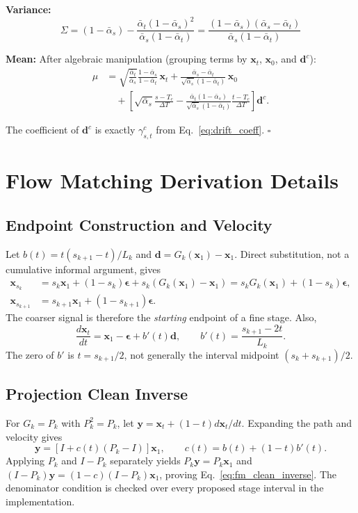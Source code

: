 \documentclass[10pt]{article}
\newcommand{\bx}{\bm{x}}
\newcommand{\beps}{\bm{\epsilon}}
\newcommand{\bd}{\bm{d}}
\newcommand{\by}{\bm{y}}
\begin{document}
\textbf{Variance:}
\begin{equation}
    \Sigma = (1-\bar\alpha_s) - \frac{\bar\alpha_t(1-\bar\alpha_s)^2}{\bar\alpha_s(1-\bar\alpha_t)} = \frac{(1-\bar\alpha_s)(\bar\alpha_s - \bar\alpha_t)}{\bar\alpha_s(1-\bar\alpha_t)}
\end{equation}

\textbf{Mean:} After algebraic manipulation (grouping terms by $\bx_t$, $\bx_0$, and $\bd^c$):
\begin{align}
    \mu &= \sqrt{\frac{\bar\alpha_t}{\bar\alpha_s}}\frac{1-\bar\alpha_s}{1-\bar\alpha_t}\,\bx_t
    +\frac{\bar\alpha_s-\bar\alpha_t}{\sqrt{\bar\alpha_s}(1-\bar\alpha_t)}\,\bx_0 \\
    &\quad +\left[\sqrt{\bar\alpha_s}\frac{s-T_c}{\Delta T}
    -\frac{\bar\alpha_t(1-\bar\alpha_s)}{\sqrt{\bar\alpha_s}(1-\bar\alpha_t)}\frac{t-T_c}{\Delta T}\right]\bd^c.
\end{align}

The coefficient of $\bd^c$ is exactly $\gamma_{s,t}^c$ from Eq.~\eqref{eq:drift_coeff}. $\square$

\section{Flow Matching Derivation Details}
\label{app:fm_derivation}

\subsection{Endpoint Construction and Velocity}
Let $b(t)=t(s_{k+1}-t)/L_k$ and $\bd=G_k(\bx_1)-\bx_1$. Direct substitution, not a cumulative informal argument, gives
\begin{align}
\bx_{s_k}
&=s_k\bx_1+(1-s_k)\beps+s_k(G_k(\bx_1)-\bx_1)
=s_kG_k(\bx_1)+(1-s_k)\beps,\\
\bx_{s_{k+1}}
&=s_{k+1}\bx_1+(1-s_{k+1})\beps.
\end{align}
The coarser signal is therefore the \emph{starting} endpoint of a fine stage. Also,
\begin{equation}
\frac{d\bx_t}{dt}=\bx_1-\beps+b'(t)\bd,
\qquad b'(t)=\frac{s_{k+1}-2t}{L_k}.
\end{equation}
The zero of $b'$ is $t=s_{k+1}/2$, not generally the interval midpoint $(s_k+s_{k+1})/2$.

\subsection{Projection Clean Inverse}
For $G_k=P_k$ with $P_k^2=P_k$, let $\by=\bx_t+(1-t)d\bx_t/dt$. Expanding the path and velocity gives
\begin{equation}
\by=[I+c(t)(P_k-I)]\bx_1,
\qquad c(t)=b(t)+(1-t)b'(t).
\end{equation}
Applying $P_k$ and $I-P_k$ separately yields $P_k\by=P_k\bx_1$ and $(I-P_k)\by=(1-c)(I-P_k)\bx_1$, proving Eq.~\eqref{eq:fm_clean_inverse}. The denominator condition is checked over every proposed stage interval in the implementation.
\end{document}
